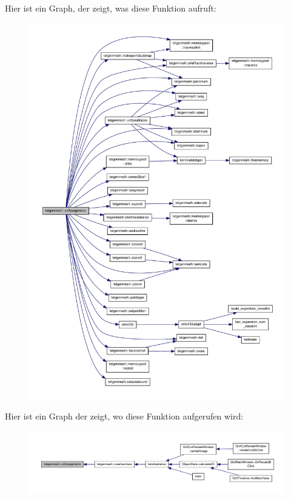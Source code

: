 Hier ist ein Graph, der zeigt, was diese Funktion aufruft\-:\nopagebreak
\begin{figure}[H]
\begin{center}
\leavevmode
\includegraphics[width=350pt]{classtetgenmesh_adcb0e0e582808c23829b42708a7596dc_cgraph}
\end{center}
\end{figure}




Hier ist ein Graph der zeigt, wo diese Funktion aufgerufen wird\-:\nopagebreak
\begin{figure}[H]
\begin{center}
\leavevmode
\includegraphics[width=350pt]{classtetgenmesh_adcb0e0e582808c23829b42708a7596dc_icgraph}
\end{center}
\end{figure}



